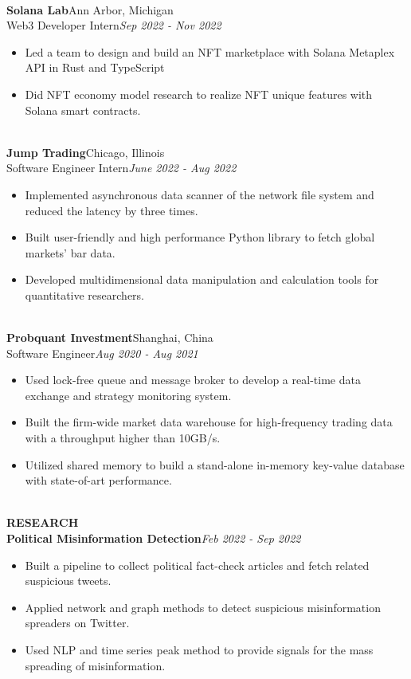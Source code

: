 \documentclass[10pt,a4paper]{article}
\begin{document}
\noindent\\
\textbf{Solana Lab}\hfill Ann Arbor, Michigan\\
Web3 Developer Intern\hfill\emph{Sep 2022 - Nov 2022}
\begin{itemize}[noitemsep,topsep=0pt]
    \item Led a team to design and build an NFT marketplace with Solana Metaplex API in Rust and TypeScript
    \item Did NFT economy model research to realize NFT unique features with Solana smart contracts.
\end{itemize}
\noindent\\
\textbf{Jump Trading}\hfill Chicago, Illinois\\
Software Engineer Intern\hfill\emph{June 2022 - Aug 2022}
\begin{itemize}[noitemsep,topsep=0pt]
    \item Implemented asynchronous data scanner of the network file system and reduced the latency by three times.
    \item Built user-friendly and high performance Python library to fetch global markets' bar data. 
    \item Developed multidimensional data manipulation and calculation tools for quantitative researchers.
\end{itemize}
\noindent\\
\textbf{Probquant Investment}\hfill Shanghai, China\\
Software Engineer\hfill\emph{Aug 2020 - Aug 2021}
\begin{itemize}[noitemsep,topsep=0pt]
    \item Used lock-free queue and message broker to develop a real-time data exchange and strategy monitoring system.
    \item Built the firm-wide market data warehouse for high-frequency trading data with a throughput higher than 10GB/s.
    \item Utilized shared memory to build a stand-alone in-memory key-value database with state-of-art performance.
\end{itemize}
\noindent\\
\rlap{\rule[-1mm]{\linewidth}{.5mm}}\textbf{\large{RESEARCH}}\\
\textbf{Political Misinformation Detection}\hfill \emph{Feb 2022 - Sep 2022}
\begin{itemize}[noitemsep,topsep=0pt]
\item Built a pipeline to collect political fact-check articles and fetch related suspicious tweets.
\item Applied network and graph methods to detect suspicious misinformation spreaders on Twitter.
\item Used NLP and time series peak method to provide signals for the mass spreading of misinformation.\\
\end{itemize}
\end{document}
